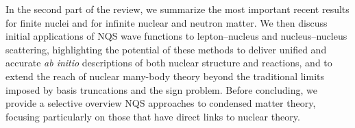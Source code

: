 In the second part of the review, we summarize the most important recent results for finite nuclei and for infinite nuclear and neutron matter. We then discuss initial applications of NQS wave functions to lepton--nucleus and nucleus--nucleus scattering, highlighting the potential of these methods to deliver unified and accurate \emph{ab initio} descriptions of both nuclear structure and reactions, and to extend the reach of nuclear many-body theory beyond the traditional limits imposed by basis truncations and the sign problem. Before concluding, we provide a selective overview NQS approaches to condensed matter theory, focusing particularly on those that have direct links to nuclear theory.

